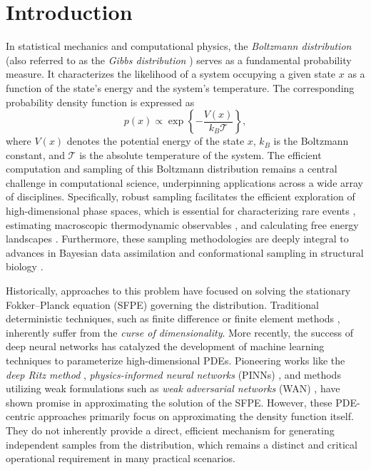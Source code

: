 \section{Introduction}
In statistical mechanics and computational physics, the \emph{Boltzmann distribution} (also referred to as the \emph{Gibbs distribution} \cite{landau2013statistical}) serves as a fundamental probability measure. It characterizes the likelihood of a system occupying a given state $x$ as a function of the state's energy and the system's temperature. The corresponding probability density function is expressed as
\begin{equation}
    p(x) \propto \exp\left\{-\frac{V(x)}{k_B\mathcal{T}}\right\},
\end{equation}
where $V(x)$ denotes the potential energy of the state $x$, $k_B$ is the Boltzmann constant, and $\mathcal{T}$ is the absolute temperature of the system. The efficient computation and sampling of this Boltzmann distribution remains a central challenge in computational science, underpinning applications across a wide array of disciplines. Specifically, robust sampling facilitates the efficient exploration of high-dimensional phase spaces, which is essential for characterizing rare events \cite{cousins2016reduced, mohamad2016probabilistic, zhang2022koopman}, estimating macroscopic thermodynamic observables \cite{cui2024multilevel, mathias_rousset_free_2010}, and calculating free energy landscapes \cite{darve2001calculating}. Furthermore, these sampling methodologies are deeply integral to advances in Bayesian data assimilation \cite{reich2015probabilistic} and conformational sampling in structural biology \cite{wuttke2014temperature}.

Historically, approaches to this problem have focused on solving the stationary Fokker--Planck equation (SFPE) governing the distribution. Traditional deterministic techniques, such as finite difference or finite element methods \cite{filbet2002numerical, kumar2006solution}, inherently suffer from the \emph{curse of dimensionality}. More recently, the success of deep neural networks has catalyzed the development of machine learning techniques to parameterize high-dimensional PDEs. Pioneering works like the \emph{deep Ritz method} \cite{e_deep_2018}, \emph{physics-informed neural networks} (PINNs) \cite{raissi2019physics}, and methods utilizing weak formulations such as \emph{weak adversarial networks} (WAN) \cite{gu2023stationary, zhai2022deep, lu2024weak, cai2024weak}, have shown promise in approximating the solution of the SFPE. However, these PDE-centric approaches primarily focus on approximating the density function itself. They do not inherently provide a direct, efficient mechanism for generating independent samples from the distribution, which remains a distinct and critical operational requirement in many practical scenarios.


